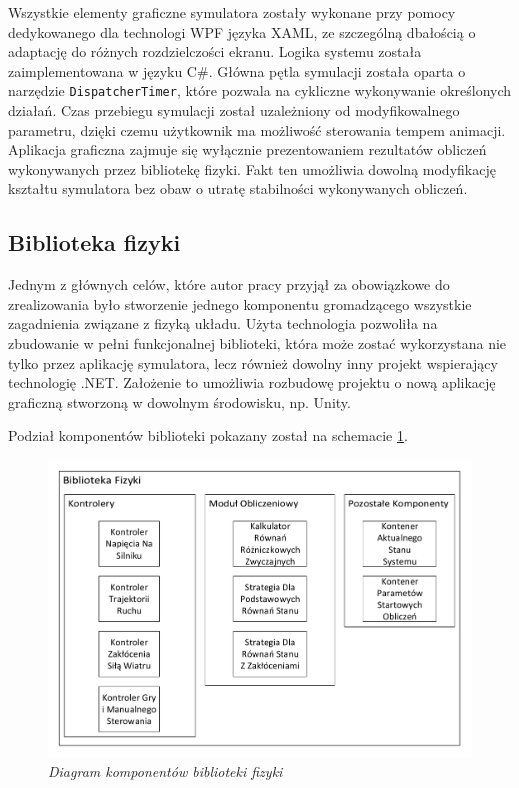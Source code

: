 \documentclass[12pt, oneside]{report}
\theoremstyle{definition}
\begin{document}
\newpage
Wszystkie elementy graficzne symulatora zostały wykonane przy pomocy dedykowanego dla technologi WPF języka XAML, ze szczególną dbałością o adaptację do różnych rozdzielczości ekranu. Logika systemu została zaimplementowana w języku C\#. Główna pętla symulacji została oparta o narzędzie \texttt{DispatcherTimer}, które pozwala na cykliczne wykonywanie określonych działań. Czas przebiegu symulacji został uzależniony od modyfikowalnego parametru, dzięki czemu użytkownik ma możliwość sterowania tempem animacji. Aplikacja graficzna zajmuje się wyłącznie prezentowaniem rezultatów obliczeń wykonywanych przez bibliotekę fizyki. Fakt ten umożliwia dowolną modyfikację kształtu symulatora bez obaw o utratę stabilności wykonywanych obliczeń. 

\subsection{Biblioteka fizyki}
Jednym z głównych celów, które autor pracy przyjął za obowiązkowe do zrealizowania było stworzenie jednego komponentu gromadzącego wszystkie zagadnienia związane z fizyką układu. Użyta technologia pozwoliła na zbudowanie w pełni funkcjonalnej biblioteki, która może zostać wykorzystana nie tylko przez aplikację symulatora, lecz również dowolny inny projekt wspierający technologię .NET. Założenie to umożliwia rozbudowę projektu o nową aplikację graficzną stworzoną w dowolnym  środowisku, np. Unity. 

Podział komponentów biblioteki pokazany został na schemacie \ref{Library}.
\begin{figure}[H]
	\centering
		\includegraphics[width = 350pt]{Library} 
		\caption{\textit{Diagram komponentów biblioteki fizyki}}
		\label{Library}
\end{figure}
\end{document}

